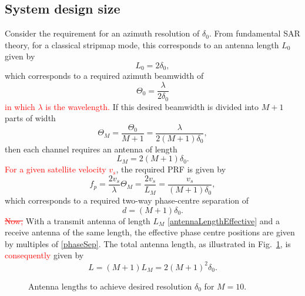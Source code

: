 \documentclass[journal]{IEEEtran}
\newcommand{\antennaLength}{\ensuremath{L}}
\newcommand{\antennaLengthDesired}{\ensuremath{L_0}}
\newcommand{\antennaLengthEffective}{\ensuremath{L_M}}
\newcommand{\wavelength}{\ensuremath{\lambda}}
\newcommand{\threeDBDesired}{\ensuremath{\Theta_{0}}}
\newcommand{\threeDBEffective}{\ensuremath{\Theta_{M}}}
\newcommand{\satv}{\ensuremath{v_s}}
\newcommand{\prf}{\ensuremath{f_p}}
\newcommand{\prfEffective}{\ensuremath{\prf}}
\newcommand{\resxDesired}{\ensuremath{\delta_0}}
\newcommand{\phaseSep}{\ensuremath{d}}
\newcommand{\cg}[1]{\textcolor{red}{#1}}
\newcommand{\cgs}[1]{\textcolor{red}{\sout{#1}}}
\begin{document}
\subsection{System design size}
Consider the requirement for an azimuth resolution of $\resxDesired$. From fundamental SAR theory, for a classical stripmap mode, this corresponds to an antenna length $\antennaLengthDesired$ given by \cite{Cumming2005}
\begin{equation}
 \antennaLengthDesired = 2\resxDesired,
\end{equation}
which corresponds to a required azimuth beamwidth of
\begin{equation}
 \threeDBDesired = \frac{\wavelength}{2\resxDesired}
\end{equation}
\cg{in which $\wavelength$ is the wavelength.}
If this desired beamwidth is divided into $M+1$ parts of width
\begin{equation}
 \threeDBEffective = \frac{\threeDBDesired}{M+1}=\frac{\wavelength}{2(M+1)\resxDesired},
\end{equation}
then each channel requires an antenna of length
\begin{equation}\label{antennaLengthEffective}
 \antennaLengthEffective = 2(M+1)\resxDesired.
\end{equation}
\cg{For a given satellite velocity $\satv$}, the required PRF is given by
\begin{equation}
 \prfEffective = \frac{2\satv}{\wavelength}\threeDBEffective = \frac{2\satv}{\antennaLengthEffective} = \frac{\satv}{(M+1)\resxDesired},
 \label{eq:requiredPRF}
\end{equation}
which corresponds to a required two-way phase-centre separation of
\begin{equation}\label{phaseSep}
 \phaseSep = (M+1)\resxDesired.
\end{equation}
\cgs{Now,} With a transmit antenna of length $\antennaLengthEffective$ \eqref{antennaLengthEffective} and a receive antenna of the same length, the effective phase centre positions are given by  multiples of \eqref{phaseSep}. The total antenna length, as illustrated in Fig.~\ref{fg:antennaLenghts}, is \cg{consequently} given by
\begin{equation}
 \antennaLength = (M+1)\antennaLengthEffective = 2(M+1)^2\resxDesired.
\end{equation}
\begin{figure}[h!]
\begin{center}
 \resizebox{0.8\columnwidth}{!}{}
 \caption{Antenna lengths to achieve desired resolution $\resxDesired$ for $M=10$.}
 \label{fg:antennaLenghts}
 \end{center}
\end{figure}
\end{document}
